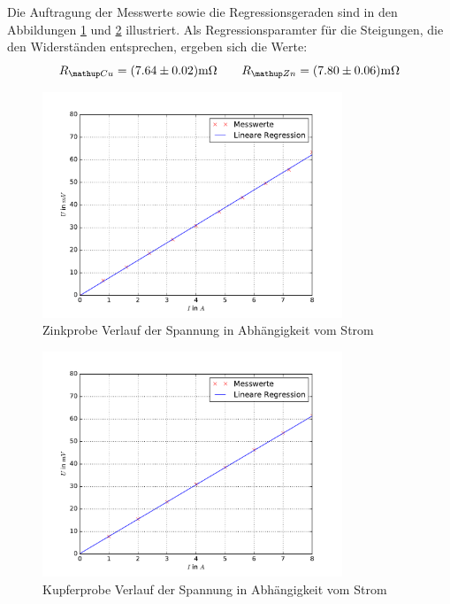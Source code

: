 \begin{minipage}{\textwidth}

\hfill

\end{minipage}
Die Auftragung der Messwerte sowie die Regressionsgeraden sind in den Abbildungen \ref{fig: uri_zink} und \ref{fig: uri_kupfer} illustriert.
Als Regressionsparamter für die Steigungen, die den Widerständen entsprechen, ergeben sich die Werte:
\begin{equation}
  R\ua{Cu} = (7.64 \pm 0.02)\si{\milli \ohm} \quad \quad R\ua{Zn} = (7.80 \pm 0.06)\si{\milli \ohm}%
  \label{eq: widerstand}
\end{equation}
\FloatBarrier
\begin{figure}
  \centering
  \includegraphics[width=0.8\textwidth]{pics/uri_zink.pdf}
  \caption{Zinkprobe Verlauf der Spannung in Abhängigkeit vom Strom}
  \label{fig: uri_zink}
\end{figure}
\begin{figure}
  \centering
  \includegraphics[width=0.8\textwidth]{pics/uri_kupfer.pdf}
  \caption{Kupferprobe Verlauf der Spannung in Abhängigkeit vom Strom}
  \label{fig: uri_kupfer}
\end{figure}



